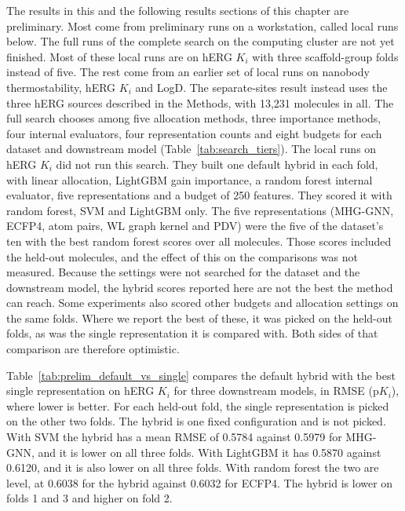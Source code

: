 \label{sec:method:results_single}


The results in this and the following results sections of this chapter are preliminary. Most come from preliminary runs on a workstation, called local runs below. The full runs of the complete search on the computing cluster are not yet finished. Most of these local runs are on hERG $K_i$ with three scaffold-group folds instead of five. The rest come from an earlier set of local runs on nanobody thermostability, hERG $K_i$ and LogD. The separate-sites result instead uses the three hERG sources described in the Methods, with 13,231 molecules in all. The full search chooses among five allocation methods, three importance methods, four internal evaluators, four representation counts and eight budgets for each dataset and downstream model (Table~\ref{tab:search_tiers}). The local runs on hERG $K_i$ did not run this search. They built one default hybrid in each fold, with linear allocation, LightGBM gain importance, a random forest internal evaluator, five representations and a budget of 250 features. They scored it with random forest, SVM and LightGBM only. The five representations (MHG-GNN, ECFP4, atom pairs, WL graph kernel and PDV) were the five of the dataset's ten with the best random forest scores over all molecules. Those scores included the held-out molecules, and the effect of this on the comparisons was not measured. Because the settings were not searched for the dataset and the downstream model, the hybrid scores reported here are not the best the method can reach. Some experiments also scored other budgets and allocation settings on the same folds. Where we report the best of these, it was picked on the held-out folds, as was the single representation it is compared with. Both sides of that comparison are therefore optimistic.

Table~\ref{tab:prelim_default_vs_single} compares the default hybrid with the best single representation on hERG $K_i$ for three downstream models, in RMSE (p$K_i$), where lower is better. For each held-out fold, the single representation is picked on the other two folds. The hybrid is one fixed configuration and is not picked. With SVM the hybrid has a mean RMSE of 0.5784 against 0.5979 for MHG-GNN, and it is lower on all three folds. With LightGBM it has 0.5870 against 0.6120, and it is also lower on all three folds. With random forest the two are level, at 0.6038 for the hybrid against 0.6032 for ECFP4. The hybrid is lower on folds 1 and 3 and higher on fold 2.

